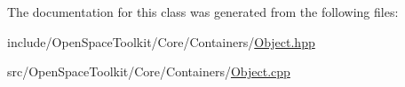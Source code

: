 The documentation for this class was generated from the following files\+:\begin{DoxyCompactItemize}
\item 
include/\+Open\+Space\+Toolkit/\+Core/\+Containers/\hyperlink{_object_8hpp}{Object.\+hpp}\item 
src/\+Open\+Space\+Toolkit/\+Core/\+Containers/\hyperlink{_object_8cpp}{Object.\+cpp}\end{DoxyCompactItemize}
